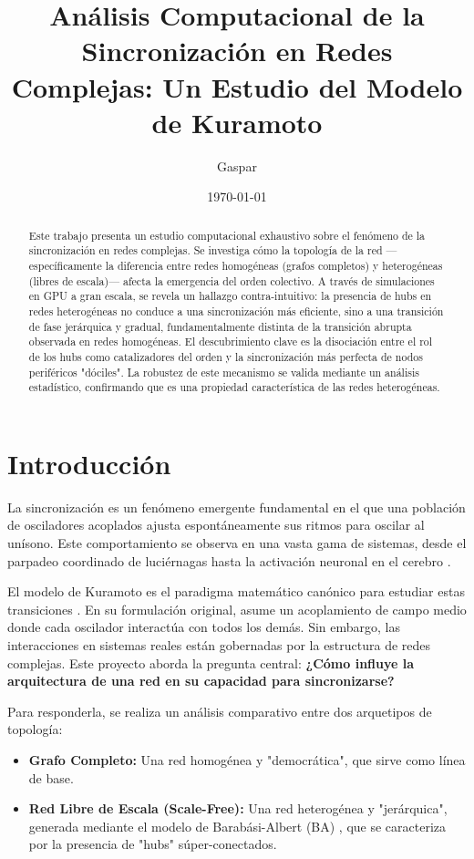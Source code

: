 \documentclass[12pt, a4paper]{article}
\title{Análisis Computacional de la Sincronización en Redes Complejas: Un Estudio del Modelo de Kuramoto}
\author{Gaspar}
\date{\today}
\begin{document}
\maketitle

\begin{abstract}
\noindent Este trabajo presenta un estudio computacional exhaustivo sobre el fenómeno de la sincronización en redes complejas. Se investiga cómo la topología de la red —específicamente la diferencia entre redes homogéneas (grafos completos) y heterogéneas (libres de escala)— afecta la emergencia del orden colectivo. A través de simulaciones en GPU a gran escala, se revela un hallazgo contra-intuitivo: la presencia de hubs en redes heterogéneas no conduce a una sincronización más eficiente, sino a una transición de fase jerárquica y gradual, fundamentalmente distinta de la transición abrupta observada en redes homogéneas. El descubrimiento clave es la disociación entre el rol de los hubs como catalizadores del orden y la sincronización más perfecta de nodos periféricos "dóciles". La robustez de este mecanismo se valida mediante un análisis estadístico, confirmando que es una propiedad característica de las redes heterogéneas.
\end{abstract}

\newpage
\tableofcontents
\newpage

\section{Introducción}

La sincronización es un fenómeno emergente fundamental en el que una población de osciladores acoplados ajusta espontáneamente sus ritmos para oscilar al unísono. Este comportamiento se observa en una vasta gama de sistemas, desde el parpadeo coordinado de luciérnagas hasta la activación neuronal en el cerebro \cite{Strogatz2003}.

El modelo de Kuramoto es el paradigma matemático canónico para estudiar estas transiciones \cite{Kuramoto1975}. En su formulación original, asume un acoplamiento de campo medio donde cada oscilador interactúa con todos los demás. Sin embargo, las interacciones en sistemas reales están gobernadas por la estructura de redes complejas. Este proyecto aborda la pregunta central: \textbf{¿Cómo influye la arquitectura de una red en su capacidad para sincronizarse?}

Para responderla, se realiza un análisis comparativo entre dos arquetipos de topología:
\begin{itemize}
    \item \textbf{Grafo Completo:} Una red homogénea y "democrática", que sirve como línea de base.
    \item \textbf{Red Libre de Escala (Scale-Free):} Una red heterogénea y "jerárquica", generada mediante el modelo de Barabási-Albert (BA) \cite{Barabasi1999}, que se caracteriza por la presencia de "hubs" súper-conectados.
\end{itemize}
\end{document}
